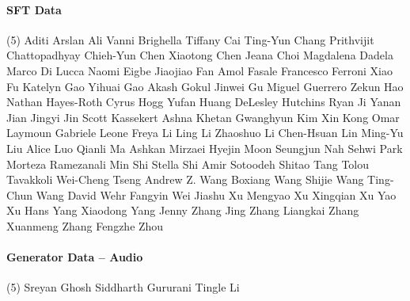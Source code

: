 \vspace{-0.32\baselineskip}\paragraph{\footnotesize SFT Data} \mbox{}
\vspace{-0.32\baselineskip}
\begingroup
\footnotesize
\begin{tasks}[label=\relax, label-width=0pt, item-indent=4pt](5)
\task Aditi 
\task Arslan Ali 
\task Vanni Brighella 
\task Tiffany Cai 
\task Ting-Yun Chang 
\task Prithvijit Chattopadhyay 
\task Chieh-Yun Chen 
\task Xiaotong Chen 
\task Jeana Choi 
\task Magdalena Dadela 
\task Marco Di Lucca 
\task Naomi Eigbe 
\task Jiaojiao Fan 
\task Amol Fasale 
\task Francesco Ferroni 
\task Xiao Fu 
\task Katelyn Gao 
\task Yihuai Gao 
\task Akash Gokul 
\task Jinwei Gu 
\task Miguel Guerrero 
\task Zekun Hao 
\task Nathan Hayes-Roth 
\task Cyrus Hogg 
\task Yufan Huang 
\task DeLesley Hutchins 
\task Ryan Ji 
\task Yanan Jian 
\task Jingyi Jin 
\task Scott Kassekert 
\task Ashna Khetan 
\task Gwanghyun Kim 
\task Xin Kong 
\task Omar Laymoun 
\task Gabriele Leone 
\task Freya Li 
\task Ling Li 
\task Zhaoshuo Li 
\task Chen-Hsuan Lin 
\task Ming-Yu Liu 
\task Alice Luo 
\task Qianli Ma 
\task Ashkan Mirzaei 
\task Hyejin Moon 
\task Seungjun Nah 
\task Sehwi Park 
\task Morteza Ramezanali 
\task Min Shi 
\task Stella Shi 
\task Amir Sotoodeh 
\task Shitao Tang 
\task Tolou Tavakkoli 
\task Wei-Cheng Tseng 
\task Andrew Z. Wang 
\task Boxiang Wang 
\task Shijie Wang 
\task Ting-Chun Wang 
\task David Wehr 
\task Fangyin Wei 
\task Jiashu Xu 
\task Mengyao Xu 
\task Xingqian Xu 
\task Yao Xu 
\task Hans Yang 
\task Xiaodong Yang 
\task Jenny Zhang 
\task Jing Zhang 
\task Liangkai Zhang 
\task Xuanmeng Zhang 
\task Fengzhe Zhou 
\end{tasks}
\endgroup

\paragraph{Generator Data -- Audio} \mbox{}
\begingroup
\footnotesize
\begin{tasks}[label=\relax, label-width=0pt, item-indent=4pt](5)
\task Sreyan Ghosh
\task Siddharth Gururani
\task Tingle Li
\end{tasks}
\endgroup

